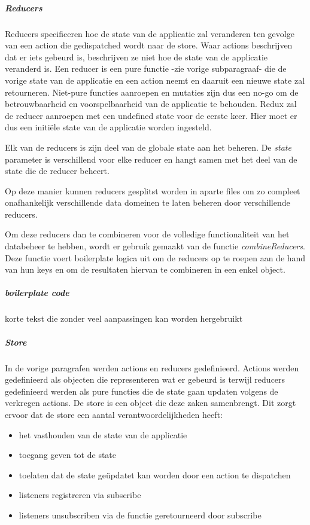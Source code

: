 \subparagraph{Reducers}
Reducers specificeren hoe de state van de applicatie zal veranderen ten gevolge van een action die gedispatched wordt naar de store. Waar actions beschrijven dat er iets gebeurd is, beschrijven ze niet hoe de state van de applicatie veranderd is. Een reducer is een pure functie -zie vorige subparagraaf- die de vorige state van de applicatie en een action neemt en daaruit een nieuwe state zal retourneren. 
Niet-pure functies aanroepen en mutaties zijn dus een no-go om de betrouwbaarheid en voorspelbaarheid van de applicatie te behouden. Redux zal de reducer aanroepen met een undefined state voor de eerste keer. Hier moet er dus een initiële state van de applicatie worden ingesteld.

Elk van de reducers is zijn deel van de globale state aan het beheren. De \textit{state} parameter is verschillend voor elke reducer en hangt samen met het deel van de state die de reducer beheert.

Op deze manier kunnen reducers gesplitst worden in aparte files om zo compleet onafhankelijk verschillende data domeinen te laten beheren door verschillende reducers. 

Om deze reducers dan te combineren voor de volledige functionaliteit van het databeheer te hebben, wordt er gebruik gemaakt van de functie \textit{combineReducers}. Deze functie voert boilerplate logica uit om de reducers op te roepen aan de hand van hun keys en om de resultaten hiervan te combineren in een enkel object. 

\subparagraph{boilerplate code}
korte tekst die zonder veel aanpassingen kan worden hergebruikt

\subparagraph{Store}
In de vorige paragrafen werden actions en reducers gedefinieerd. Actions werden gedefinieerd als objecten die representeren wat er gebeurd is terwijl reducers gedefinieerd werden als pure functies die de state gaan updaten volgens de verkregen actions. De store is een object die deze zaken samenbrengt. Dit zorgt ervoor dat de store een aantal verantwoordelijkheden heeft:

\begin{itemize}
	\item het vasthouden van de state van de applicatie
	\item toegang geven tot de state
	\item toelaten dat de state geüpdatet kan worden door een action te dispatchen
	\item listeners registreren via subscribe
	\item listeners unsubscriben via de functie geretourneerd door subscribe
\end{itemize}

